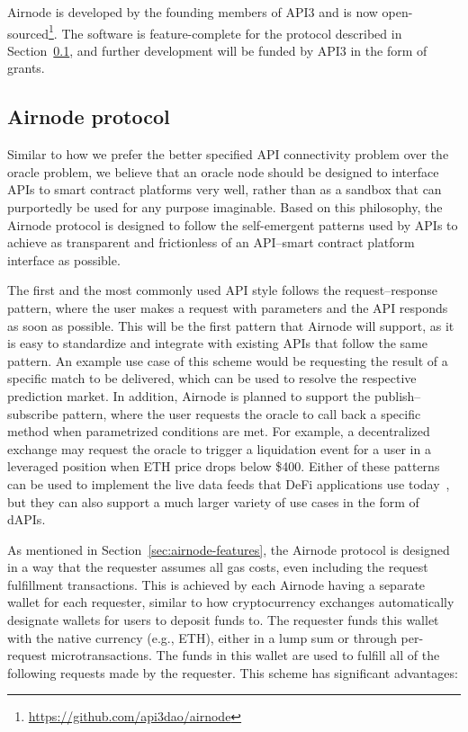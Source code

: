 \documentclass[11pt]{article}
\begin{document}
Airnode is developed by the founding members of API3 and is now open-sourced\footnote{\url{https://github.com/api3dao/airnode}}.
The software is feature-complete for the protocol described in Section~\ref{sec:airnode-protocol}, and further development will be funded by API3 in the form of grants.

\subsection{Airnode protocol}
\label{sec:airnode-protocol}

Similar to how we prefer the better specified API connectivity problem over the oracle problem, we believe that an oracle node should be designed to interface APIs to smart contract platforms very well, rather than as a sandbox that can purportedly be used for any purpose imaginable.
Based on this philosophy, the Airnode protocol is designed to follow the self-emergent patterns used by APIs to achieve as transparent and frictionless of an API--smart contract platform interface as possible.

The first and the most commonly used API style follows the request--response pattern, where the user makes a request with parameters and the API responds as soon as possible.
This will be the first pattern that Airnode will support, as it is easy to standardize and integrate with existing APIs that follow the same pattern.
An example use case of this scheme would be requesting the result of a specific match to be delivered, which can be used to resolve the respective prediction market.
In addition, Airnode is planned to support the publish--subscribe pattern, where the user requests the oracle to call back a specific method when parametrized conditions are met.
For example, a decentralized exchange may request the oracle to trigger a liquidation event for a user in a leveraged position when ETH price drops below \$400.
Either of these patterns can be used to implement the live data feeds that DeFi applications use today~\cite{liu:2020}, but they can also support a much larger variety of use cases in the form of dAPIs.

As mentioned in Section~\ref{sec:airnode-features}, the Airnode protocol is designed in a way that the requester assumes all gas costs, even including the request fulfillment transactions.
This is achieved by each Airnode having a separate wallet for each requester, similar to how cryptocurrency exchanges automatically designate wallets for users to deposit funds to.
The requester funds this wallet with the native currency (e.g., ETH), either in a lump sum or through per-request microtransactions.
The funds in this wallet are used to fulfill all of the following requests made by the requester.
This scheme has significant advantages:
\end{document}
